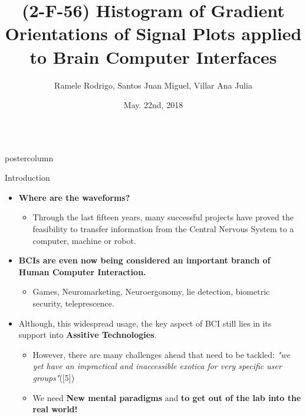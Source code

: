 \documentclass[final]{beamer}
\title{\huge (2-F-56) Histogram of Gradient Orientations of Signal Plots applied to Brain Computer Interfaces}
\author{Ramele Rodrigo, Santos Juan Miguel, Villar Ana Julia}
\institute[Instituto Tecnológico de Buenos Aires]{Computer Engineering Department,Graduate School of Engineering, Buenos Aires, Argentina}
\date[May. 22nd, 2018]{May. 22nd, 2018}
\newlength{\columnheight}
\begin{document}
\begin{frame}

  \begin{columns}
    \begin{column}{.49\textwidth}
      \begin{beamercolorbox}[center,wd=\textwidth]{postercolumn}
        \begin{minipage}[T]{.95\textwidth}  %
          \parbox[t][\columnheight]{\textwidth}{ %
            \begin{block}{Introduction}
              \begin{itemize}
              \item \textbf{Where are the waveforms?}
                \begin{itemize}
                \item Through the last fifteen years, many successful projects have proved the feasibility  to transfer information from the Central Nervous System to a computer, machine or robot.
                \end{itemize}
              \item \textbf{BCIs are even now being considered an important branch of Human Computer Interaction.}
                \begin{itemize}
                \item Games, Neuromarketing, Neuroergonomy, lie detection, biometric security, teleprescence.
                \end{itemize}
              \item Although, this widespread usage, the key aspect of BCI still lies in its support into \textbf{Assitive Technologies}.   
                \begin{itemize}
                \item However,  there are many challenges ahead that need to be tackled: \textit{"we yet have an impractical and inaccessible exotica for very specific user groups"}([5])
                \item We need \textbf{New mental paradigms} and \textbf{to get out of the lab into the real world!}

\end{itemize}
\end{itemize}
\end{block}}
\end{minipage}
\end{beamercolorbox}
\end{column}
\end{columns}
\end{frame}
\end{document}
